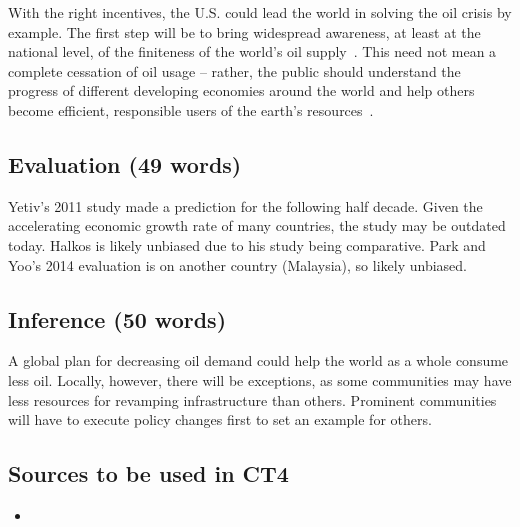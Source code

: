 \documentclass[12pt,letterpaper]{article}
\begin{document}
With the right incentives, the U.S. could lead the world in solving the oil
crisis by example. The first step will be to bring widespread awareness, at
least at the national level, of the finiteness of the world's oil
supply~\citep[p. 289]{yetiv2011}. This need not mean a complete cessation of
oil usage -- rather, the public should understand the progress of different
developing economies around the world and help others become efficient,
responsible users of the earth's resources~\citep[p. 1361]{halkos2011}.

\subsection*{Evaluation (49 words)}   %

Yetiv's 2011 study made a prediction for the following half decade.  Given the
accelerating economic growth rate of many countries, the study may be outdated
today. Halkos is likely unbiased due to his study being comparative. Park and
Yoo's 2014 evaluation is on another country (Malaysia), so likely unbiased.

\subsection*{Inference (50 words)}   %

A global plan for decreasing oil demand could help the world as a whole consume
less oil. Locally, however, there will be exceptions, as some communities may
have less resources for revamping infrastructure than others.  Prominent
communities will have to execute policy changes first to set an example for
others.

\subsection*{Sources to be used in CT4}

\begin{itemize}
  \item \citet{gately2012}
\end{itemize}



\end{document}
